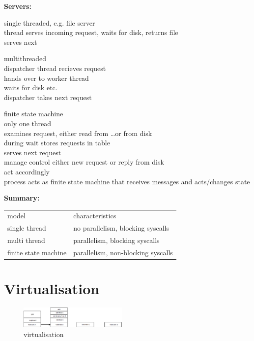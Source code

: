 \textbf{Servers:}\\
\begin{compactitem}
\item single threaded, e.g. file server\\
thread serves incoming request, waits for disk, returns file\\
serves next
\item multithreaded\\
dispatcher thread recieves request\\
hands over to worker thread\\
waits for disk etc.\\
dispatcher takes next request
\item finite state machine\\
only one thread\\
examines request, either read from \ldots or from disk\\
during wait stores requests in table\\
serves next request\\
manage control either new request or reply from disk\\
act accordingly\\
process acts as finite state machine that receives messages and acts/changes state
\end{compactitem}


\textbf{Summary:}\\
\begin{tabular}{l l}
model&characteristics\\
single thread& no parallelism, blocking syscalls\\
multi thread& parallelism, blocking syscalls\\
finite state machine& parallelism, non-blocking syscalls\\
\end{tabular}

\section{Virtualisation}
\begin{figure}[h]
	\centering
	\includegraphics[width=200px]{gfx/virtualisation_1.png}
	\caption{virtualisation}
	\label{img:virtualisation_1}
\end{figure}

